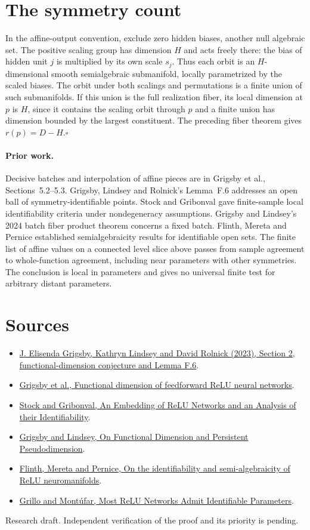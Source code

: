 \documentclass[10pt]{article}
\begin{document}
\section*{The symmetry count}
In the affine-output convention, exclude zero hidden biases, another null algebraic set. The positive scaling group has dimension $H$ and acts freely there: the bias of hidden unit $j$ is multiplied by its own scale $s_j$. Thus each orbit is an $H$-dimensional smooth semialgebraic submanifold, locally parametrized by the scaled biases. The orbit under both scalings and permutations is a finite union of such submanifolds. If this union is the full realization fiber, its local dimension at $p$ is $H$, since it contains the scaling orbit through $p$ and a finite union has dimension bounded by the largest constituent. The preceding fiber theorem gives $r(p)=D-H$.\hfill$\square$

\paragraph{Prior work.} Decisive batches and interpolation of affine pieces are in Grigsby et al., Sections~5.2--5.3. Grigsby, Lindsey and Rolnick's Lemma~F.6 addresses an open ball of symmetry-identifiable points. Stock and Gribonval gave finite-sample local identifiability criteria under nondegeneracy assumptions. Grigsby and Lindsey's 2024 batch fiber product theorem concerns a fixed batch. Flinth, Mereta and Pernice established semialgebraicity results for identifiable open sets. The finite list of affine values on a connected level slice above passes from sample agreement to whole-function agreement, including near parameters with other symmetries. The conclusion is local in parameters and gives no universal finite test for arbitrary distant parameters.

\section*{Sources}
\begin{itemize}
\item \href{https://proceedings.mlr.press/v202/grigsby23a.html}{J. Elisenda Grigsby, Kathryn Lindsey and David Rolnick (2023), Section 2, functional-dimension conjecture and Lemma F.6}.
\item \href{https://arxiv.org/abs/2209.04036}{Grigsby et al., Functional dimension of feedforward ReLU neural networks}.
\item \href{https://arxiv.org/abs/2107.09370}{Stock and Gribonval, An Embedding of ReLU Networks and an Analysis of their Identifiability}.
\item \href{https://arxiv.org/abs/2410.17191}{Grigsby and Lindsey, On Functional Dimension and Persistent Pseudodimension}.
\item \href{https://arxiv.org/abs/2606.02826}{Flinth, Mereta and Pernice, On the identifiability and semi-algebraicity of ReLU neuromanifolds}.
\item \href{https://arxiv.org/abs/2605.03601}{Grillo and Mont\'ufar, Most ReLU Networks Admit Identifiable Parameters}.
\end{itemize}
{\small Research draft. Independent verification of the proof and its priority is pending.}
\end{document}
